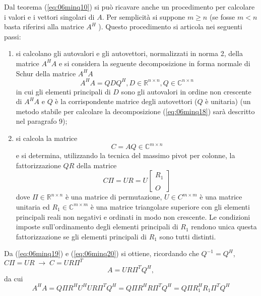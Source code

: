 Dal teorema (\ref{eq:06minq10}) 
si pu\`o ricavare anche un procedimento per calcolare
i valori e i vettori singolari di $A$. Per semplicit\`a si suppone
 $m \geq  n$ (se fosse  $m < n$ basta riferirsi alla matrice
 $A^H$ ). Questo procedimento si articola nei seguenti passi:
 \begin{enumerate}
 \item   si calcolano gli autovalori e gli autovettori,
 normalizzati in norma 2, della matrice $A^H A$ e si considera la
 seguente decomposizione in forma normale di Schur della matrice
$ A^H A$
\begin{equation}
  \label{eq:06minq18}
A^H A = QDQ^H , D \in \mathbb{R}^{n\times n} , Q \in 
\mathbb{C}^{n \times n}   
\end{equation}
in cui gli elementi principali di $D$ sono gli autovalori in 
ordine non crescente di $A^H A$ e $Q$ \`e la corrispondente 
matrice degli autovettori ($Q$ \`e unitaria) (un
metodo stabile per calcolare la decomposizione 
(\ref{eq:06minq18}) sar\`a
 descritto nel  paragrafo 9);

\item
 si calcola la matrice
 \begin{equation}
   \label{eq:06minq19}
  C = AQ \in \mathbb{C}^{m \times n} 
 \end{equation}
e si determina, utilizzando la tecnica del massimo pivot 
per colonne, la fattorizzazione $QR$ della matrice
\begin{equation}
  \label{eq:06minq20}
  C\Pi  = UR = U 
\left[
\begin{array}{c}
R_1  \\
     \\
O
\end{array}
\right]
\end{equation}
dove $\Pi \in \mathbb{R}^{n \times n}$ \`e una matrice di
permutazione, $U \in C^{m \times m}$ \`e una matrice unitaria ed $R_1
\in \mathbb{C}^{m \times m}$ \`e una matrice triangolare superiore con
gli elementi principali reali non negativi e ordinati in modo non
crescente. Le condizioni imposte sull'ordinamento degli elementi
principali di $R_1$ rendono unica questa fattorizzazione se gli
elementi principali di $R_1$ sono tutti distinti.

 \end{enumerate}
Da (\ref{eq:06minq19}) e 
(\ref{eq:06minq20}) si ottiene,
ricordando che $Q^{-1} = Q^{H}$, $C\Pi = UR \;\rightarrow \; C = UR\Pi^{T}$
\begin{equation}
  \label{eq:06minq21}
A = U R\Pi^T Q^H ,
\end{equation}
da cui
$$A^H A = Q\Pi R^H U^H U R\Pi^T Q^H = Q\Pi R^H R\Pi^T Q^H =
 Q\Pi R_1^{H} R_1 \Pi^{T}Q^{H}$$

